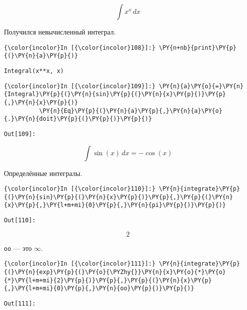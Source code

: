     \[\int x^{x}\, dx\]

    

    Получился невычисленный интеграл.

    \begin{Verbatim}[commandchars=\\\{\}]
{\color{incolor}In [{\color{incolor}108}]:} \PY{n+nb}{print}\PY{p}{(}\PY{n}{a}\PY{p}{)}
\end{Verbatim}

    \begin{Verbatim}[commandchars=\\\{\}]
Integral(x**x, x)

    \end{Verbatim}

    \begin{Verbatim}[commandchars=\\\{\}]
{\color{incolor}In [{\color{incolor}109}]:} \PY{n}{a}\PY{o}{=}\PY{n}{Integral}\PY{p}{(}\PY{n}{sin}\PY{p}{(}\PY{n}{x}\PY{p}{)}\PY{p}{,}\PY{n}{x}\PY{p}{)}
          \PY{n}{Eq}\PY{p}{(}\PY{n}{a}\PY{p}{,}\PY{n}{a}\PY{o}{.}\PY{n}{doit}\PY{p}{(}\PY{p}{)}\PY{p}{)}
\end{Verbatim}
\texttt{\color{outcolor}Out[{\color{outcolor}109}]:}
    
    \[\int \sin{\left (x \right )}\, dx = - \cos{\left (x \right )}\]

    

    Определённые интегралы.

    \begin{Verbatim}[commandchars=\\\{\}]
{\color{incolor}In [{\color{incolor}110}]:} \PY{n}{integrate}\PY{p}{(}\PY{n}{sin}\PY{p}{(}\PY{n}{x}\PY{p}{)}\PY{p}{,}\PY{p}{(}\PY{n}{x}\PY{p}{,}\PY{l+m+mi}{0}\PY{p}{,}\PY{n}{pi}\PY{p}{)}\PY{p}{)}
\end{Verbatim}
\texttt{\color{outcolor}Out[{\color{outcolor}110}]:}
    
    \[2\]

    

    \texttt{oo} --- это \(\infty\).

    \begin{Verbatim}[commandchars=\\\{\}]
{\color{incolor}In [{\color{incolor}111}]:} \PY{n}{integrate}\PY{p}{(}\PY{n}{exp}\PY{p}{(}\PY{o}{\PYZhy{}}\PY{n}{x}\PY{o}{*}\PY{o}{*}\PY{l+m+mi}{2}\PY{p}{)}\PY{p}{,}\PY{p}{(}\PY{n}{x}\PY{p}{,}\PY{l+m+mi}{0}\PY{p}{,}\PY{n}{oo}\PY{p}{)}\PY{p}{)}
\end{Verbatim}
\texttt{\color{outcolor}Out[{\color{outcolor}111}]:}
    
